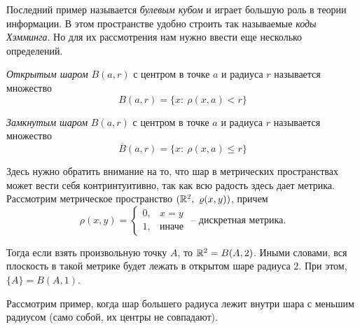 \documentclass[../functional-analysis_17-18.tex]{subfiles}
\begin{document}
	Последний пример называется \textit{булевым кубом} и играет большую роль в теории информации. В этом пространстве удобно строить так называемые \textit{коды Хэмминга}. Но для их рассмотрения нам нужно ввести еще несколько определений.
	
	\begin{definition}
		\textit{Открытым шаром} $B(a, r)$ с центром в точке $a$ и радиуса $r$ называется множество
		\begin{equation}
			B(a, r) = \{x: \ \rho(x, a) < r\}
		\end{equation}		
	\end{definition}
		\begin{definition}
		\textit{Замкнутым шаром} $B(a, r)$ с центром в точке $a$ и радиуса $r$ называется множество
		\begin{equation}
		\overline{B}(a, r) = \{x: \ \rho(x, a) \leq r\}
		\end{equation}		
	\end{definition}

	Здесь нужно обратить внимание на то, что шар в метрических пространствах может вести себя контринтуитивно, так как всю радость здесь дает метрика. Рассмотрим метрическое пространство $(\mathbb{R}^2, \ \varrho(x, y))$, причем
	\begin{equation}
		\rho(x, y) = 
		\begin{cases}
			0, &x = y \\
			1, &\text{иначе}
		\end{cases}
		\textit{ -- дискретная метрика.}
	\end{equation}
	
	Тогда если взять произвольную точку $A$, то $\mathbb{R}^2 = B(A, 2)$. Иными словами, вся плоскость в такой метрике будет лежать в открытом шаре радиуса 2. При этом, $\{A\} = B(A, 1)$.
	
	\begin{wrapfigure}{r}{0.5\textwidth}
		\centering
	\end{wrapfigure}
	Рассмотрим пример, когда шар большего радиуса лежит внутри шара с меньшим радиусом (само собой, их центры не совпадают).
	
\end{document}
